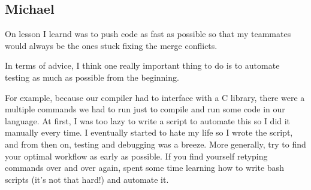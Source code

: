 \subsection{Michael}

On lesson I learnd was to push code as fast as possible so that my teammates
would always be the ones stuck fixing the merge conflicts.

In terms of advice, I think one really important thing to do is to
automate testing as much as possible from the beginning.

For example,
because our compiler had to interface with a C library, there were
a multiple commands we had to run just to compile and run some code
in our language.
At first, I was too lazy to write a script to automate this so I
did it manually every time. I eventually started to hate my life so 
I wrote the script, and from then on, testing and debugging was
a breeze. More generally, try to find your optimal workflow as early
as possible. If you find yourself retyping commands over and over again,
spent some time learning how to write bash scripts (it's not that hard!)
and automate it.